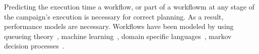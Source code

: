 
Predicting the execution time a workflow, or part of a workflowm at any stage 
of the campaign's execution is necessary for correct planning. As a result, 
performance models are necessary. Workflows have been modeled by using queueing 
theory~\cite{bao2019performance,yao2019throughput}, machine learning~\cite
{witt2019predictive,pumma2017runtime}, domain specific languages~\cite
{deelman2017performance,mandal2016toward}, markov decision processes~\cite
{jia2005cost}.

